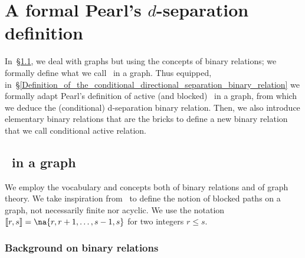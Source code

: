 \documentclass[12pt]{article}
\def\citep#1{\cite{#1}}
\begin{document}
\section{A formal Pearl's $d$-separation definition}
\label{Conditional_active_relation_induced_by_endpoints_of_non-blocking_paths}

In~\S\ref{UndirectedEdgePaths_in_a_graph}, we deal with
graphs but using the concepts of binary relations;
we formally define what we call \undirectedEdgePaths\ in a graph.
Thus equipped, in~\S\ref{Definition_of_the_conditional_directional_separation_binary_relation}
we formally adapt Pearl's definition of active (and blocked)
\undirectedEdgePaths\ in a graph,
from which we deduce the (conditional) d-separation binary relation.
Then, we also introduce elementary binary relations that are the bricks
to define a new binary relation that we call conditional active relation.

\subsection{\UndirectedEdgePaths\ in a graph}
\label{UndirectedEdgePaths_in_a_graph}

We employ the vocabulary and concepts both of binary relations and of graph theory.
% 
We take inspiration from~\citep{PEARL1986357} to define the notion of blocked paths
on a graph, not necessarily finite nor acyclic.
% 
We use the notation \( \ic{r,s}=\na{r,r+1,\ldots,s-1,s} \) for two integers $r \leq s$.

\subsubsection{Background on binary relations}
\end{document}

